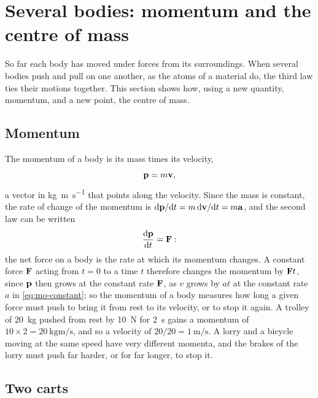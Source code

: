 \section{Several bodies: momentum and the centre of mass}
\label{sec:ne-bodies}

So far each body has moved under forces from its surroundings. When
several bodies push and pull on one another, as the atoms of a material
do, the third law ties their motions together. This section shows how,
using a new quantity, momentum, and a new point, the centre of mass.

\subsection*{Momentum}

The momentum of a body is its mass times its velocity,
\begin{equation*}
   \bm{\mathrm{p}} = m\bm{\mathrm{v}} ,
\end{equation*}
a vector in \si{\kilogram\metre\per\second} that points along the
velocity. Since the mass is constant, the rate of change of the momentum
is $\mathrm{d}\bm{\mathrm{p}}/\mathrm{d} t = m\,\mathrm{d}\bm{\mathrm{v}}/\mathrm{d} t = m\bm{\mathrm{a}}$, and the second law
can be written
\begin{equation*}
   \frac{\mathrm{d}\bm{\mathrm{p}}}{\mathrm{d} t} = \bm{\mathrm{F}} :
\end{equation*}
the net force on a body is the rate at which its momentum changes. A
constant force $\bm{\mathrm{F}}$ acting from $t = 0$ to a time $t$ therefore
changes the momentum by $\bm{\mathrm{F}}t$, since $\bm{\mathrm{p}}$ then grows at the
constant rate $\bm{\mathrm{F}}$, as $v$ grows by $at$ at the constant rate $a$ in
\cref{eq:mo-constant}; so the momentum of a body measures how long
a given force must push to bring it from rest to its velocity, or to stop
it again. A trolley of \SI{20}{\kilogram} pushed from rest by
\SI{10}{\newton} for \SI{2}{\second} gains a momentum of $10\times2 =
\SI{20}{\kilogram\metre\per\second}$, and so a velocity of $20/20 =
\SI{1}{\metre\per\second}$. A lorry and a bicycle moving at the same
speed have very different momenta, and the brakes of the lorry must push
far harder, or for far longer, to stop it.

\subsection*{Two carts}

